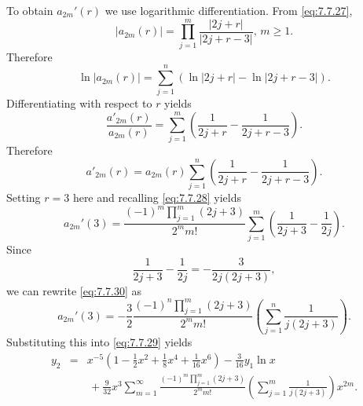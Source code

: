 \documentclass{ximera}
\begin{document}
\begin{example}
\begin{explanation}
To obtain $a_{2m}'(r)$  we use logarithmic differentiation. From
\eqref{eq:7.7.27},
$$
|a_{2m}(r)|=\prod_{j=1}^m\frac{|2j+r|}{|2j+r-3|},\,m\geq 1.
$$
Therefore
$$
\ln |a_{2m}(r)|=\sum^n_{j=1} \left(\ln |2j+r|-\ln|2j+r-3|\right).
$$
Differentiating  with respect to $r$ yields
$$
\frac{a'_{2m}(r)}{a_{2m}(r)}=\sum^m_{j=1} \left(\frac{1}{2j+r}-\frac{1}{2j+r-3}\right).
$$
Therefore
$$
a'_{2m}(r)=a_{2m}(r) \sum^n_{j=1} \left(\frac{1}{2j+r}-\frac{1}{2j+r-3}\right).
$$
Setting $r=3$ here and recalling \eqref{eq:7.7.28} yields
\begin{equation} \label{eq:7.7.30}
a_{2m}'(3)=\frac{(-1)^m\prod_{j=1}^m(2j+3)}{2^mm!}\sum_{j=1}^m
\left(\frac{1}{2j+3}-\frac{1}{2j}\right).
\end{equation}
Since
$$
\frac{1}{2j+3}-\frac{1}{2j}=-\frac{3}{2j(2j+3)},
$$
we can rewrite \eqref{eq:7.7.30} as
$$
a_{2m}'(3)=-\frac{3}{2}\frac{(-1)^n\prod_{j=1}^m(2j+3)}{2^mm!}
\left(\sum_{j=1}^n\frac{1}{j(2j+3)}\right).
$$
Substituting this into \eqref{eq:7.7.29} yields
\begin{eqnarray*}
y_2&=&x^{-5}
\left(1-\frac{1}{2}x^2+\frac{1}{8}x^4+\frac{1}{16}x^6\right)
-\frac{3}{16}y_1\ln x \\
&&\, +\frac{9}{32}
x^3\sum_{m=1}^\infty
\frac{(-1)^m\prod_{j=1}^m(2j+3)}{2^mm!}\left(\sum_{j=1}^m\frac{1}{j(2j+3)}\right) x^{2m}.
\end{eqnarray*}
\end{explanation}
\end{example}
\end{document}
